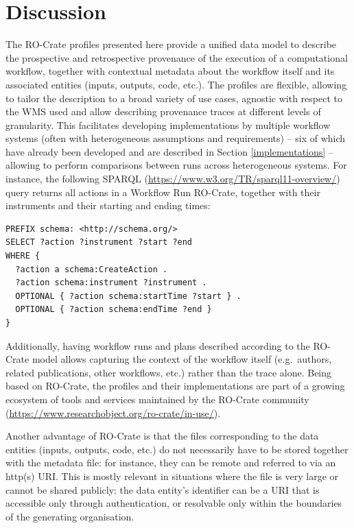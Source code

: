 \documentclass[10pt,letterpaper]{article}
\begin{document}
%
\section{Discussion}\label{discussion}


The RO-Crate profiles presented here provide a unified data model to describe the prospective and retrospective provenance of the execution of a computational workflow, together with contextual metadata about the workflow itself and its associated entities (inputs, outputs, code, etc.). 
The profiles are flexible, allowing to tailor the description to a broad variety of use cases, agnostic with respect to the WMS used and allow describing provenance traces at different levels of granularity. 
This facilitates developing implementations by multiple workflow systems (often with heterogeneous assumptions and requirements) -- six of which have already been developed and are described in Section \ref{implementations} -- allowing to perform comparisons between runs across heterogeneous systems.
For instance, the following SPARQL (\url{https://www.w3.org/TR/sparql11-overview/}) query returns all actions in a Workflow Run RO-Crate, together with their instruments and their starting and ending times:

\begin{verbatim}
PREFIX schema: <http://schema.org/>
SELECT ?action ?instrument ?start ?end
WHERE {
  ?action a schema:CreateAction .
  ?action schema:instrument ?instrument .
  OPTIONAL { ?action schema:startTime ?start } .
  OPTIONAL { ?action schema:endTime ?end }
}
\end{verbatim}

Additionally, having workflow runs and plans described according to the RO-Crate model allows capturing the context of the workflow itself (e.g.~authors, related publications, other workflows, etc.) rather than the trace alone. 
Being based on RO-Crate, the profiles and their implementations are part of a growing ecosystem of tools and services maintained by the RO-Crate community (\url{https://www.researchobject.org/ro-crate/in-use/}).

Another advantage of RO-Crate is that the files corresponding to the data entities (inputs, outputs, code, etc.) do not necessarily have to be stored together with the metadata file: for instance, they can be remote and referred to via an http(s) URI. This is mostly relevant in situations where the file is very large or cannot be shared publicly: the data entity's identifier can be a URI that is accessible only through authentication, or resolvable only within the boundaries of the generating organisation.
\end{document}
